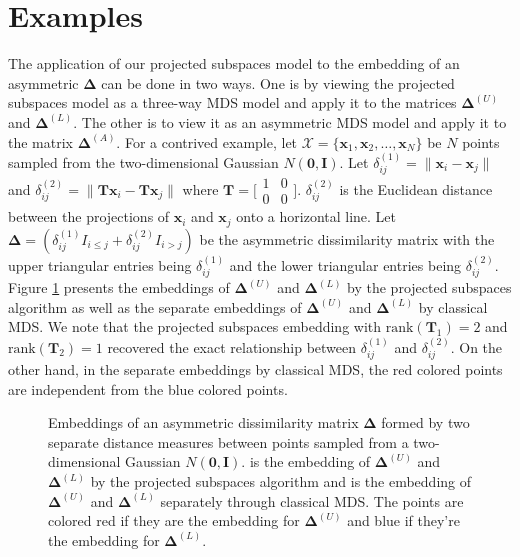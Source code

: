 \documentclass[11pt]{asaproc}
\begin{document}
\section{Examples}
\label{sec:examples}
The application of our projected subspaces model to the embedding of an
asymmetric $\bm{\Delta}$ can be done in two ways. One is by viewing
the projected subspaces model as a three-way MDS model and apply it to the
matrices $\bm{\Delta}^{(U)}$ and $\bm{\Delta}^{(L)}$. The other is to
view it as an asymmetric MDS model and apply it to the matrix
$\bm{\Delta}^{(A)}$. For a contrived example, let $\mathcal{X} =
\{\mathbf{x}_1, \mathbf{x}_2, \dots, \mathbf{x}_N\}$ be $N$ points
sampled from the two-dimensional Gaussian  $N(\mathbf{0},
\mathbf{I})$. Let $\delta_{ij}^{(1)} = \| \mathbf{x}_i - \mathbf{x}_j
\|$ and $\delta_{ij}^{(2)} = \| \mathbf{T}\mathbf{x}_i - \mathbf{T}\mathbf{x}_j
\|$ where $\mathbf{T} = \bigl[\begin{smallmatrix} 1 & 0 \\ 0 &
  0 \end{smallmatrix} \bigr]$. $\delta_{ij}^{(2)}$ is the Euclidean distance
between the projections of $\mathbf{x}_i$ and $\mathbf{x}_j$ onto a
horizontal line. Let $\bm{\Delta} = (\delta_{ij}^{(1)} I_{i \leq j} +
\delta_{ij}^{(2)} I_{i > j})$ be the asymmetric dissimilarity matrix
with the upper triangular entries being $\delta_{ij}^{(1)}$ and the
lower triangular entries being $\delta_{ij}^{(2)}$. Figure
\ref{fig:toy1} presents the embeddings of $\bm{\Delta}^{(U)}$ and
$\bm{\Delta}^{(L)}$ by the
projected subspaces algorithm as well as the separate embeddings of
$\bm{\Delta}^{(U)}$ and $\bm{\Delta}^{(L)}$ by classical MDS. We note
that the projected subspaces embedding with
$\mathrm{rank}(\mathbf{T}_1) = 2$ and $\mathrm{rank}(\mathbf{T}_2) =
1$ recovered the exact relationship between
$\delta_{ij}^{(1)}$ and $\delta_{ij}^{(2)}$. On the other hand, in the
separate embeddings by classical MDS, the red colored points are
independent from the blue colored points.  
\begin{figure}[htbp]
  \centering
  \hspace{8pt}
  \caption{Embeddings of an asymmetric dissimilarity matrix
    $\bm{\Delta}$ formed by two separate distance measures between
    points sampled from a two-dimensional Gaussian $N(\mathbf{0},
    \mathbf{I})$.  is the embedding of
    $\bm{\Delta}^{(U)}$ and $\bm{\Delta}^{(L)}$ by the projected
    subspaces algorithm and  is the
    embedding of $\bm{\Delta}^{(U)}$ and $\bm{\Delta}^{(L)}$
    separately through classical MDS. The points are colored red if
    they are the embedding for $\bm{\Delta}^{(U)}$ and blue if they're
    the embedding for $\bm{\Delta}^{(L)}$. }  
  \label{fig:toy1}
\end{figure}
\end{document}
